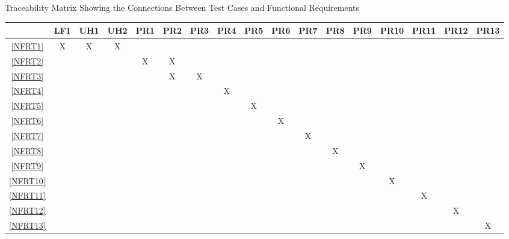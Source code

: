 \documentclass[12pt, titlepage]{article}
\begin{document}
\begin{landscape}
\begin{table}[h!]
    \caption{Traceability Matrix Showing the Connections Between Test Cases
      and Functional Requirements}
    \label{tab:frt}
  \end{table}
  \begin{table}[h!]
    \centering
    \begin{tabular}{|c|c|c|c|c|c|c|c|c|c|c|c|c|c|c|c|c|} \hline
                & LF1 & UH1 & UH2 & PR1 & PR2 & PR3 & PR4 & PR5 & PR6 & PR7 & PR8 & PR9 & PR10 & PR11 & PR12 & PR13 \\ \hline
      \ref{NFRT1}  & X   & X   & X   &     &     &     &     &     &     &     &     &     &      &      &      &      \\ \hline
      \ref{NFRT2}  &     &     &     & X   & X   &     &     &     &     &     &     &     &      &      &      &      \\ \hline
      \ref{NFRT3}  &     &     &     &     & X   & X   &     &     &     &     &     &     &      &      &      &      \\ \hline
      \ref{NFRT4}  &     &     &     &     &     &     & X   &     &     &     &     &     &      &      &      &      \\ \hline
      \ref{NFRT5}  &     &     &     &     &     &     &     & X   &     &     &     &     &      &      &      &      \\ \hline
      \ref{NFRT6}  &     &     &     &     &     &     &     &     & X   &     &     &     &      &      &      &      \\ \hline
      \ref{NFRT7}  &     &     &     &     &     &     &     &     &     & X   &     &     &      &      &      &      \\ \hline
      \ref{NFRT8}  &     &     &     &     &     &     &     &     &     &     & X   &     &      &      &      &      \\ \hline
      \ref{NFRT9}  &     &     &     &     &     &     &     &     &     &     &     & X   &      &      &      &      \\ \hline
      \ref{NFRT10} &     &     &     &     &     &     &     &     &     &     &     &     & X    &      &      &      \\ \hline
      \ref{NFRT11} &     &     &     &     &     &     &     &     &     &     &     &     &      & X    &      &      \\ \hline
      \ref{NFRT12} &     &     &     &     &     &     &     &     &     &     &     &     &      &      & X    &      \\ \hline
      \ref{NFRT13} &     &     &     &     &     &     &     &     &     &     &     &     &      &      &      & X    \\ \hline

\end{tabular}
\end{table}
\end{landscape}
\end{document}
